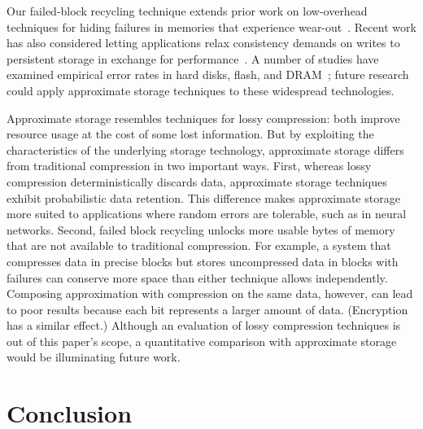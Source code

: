 \documentclass[prodmode,acmtocs]{acmsmall}
\begin{document}

Our failed-block recycling technique extends prior work on low-overhead
techniques for hiding failures in memories that experience
wear-out~\cite{ecp,safer,payg,zombie}.
Recent work has also considered letting applications relax
consistency demands on writes to persistent storage in exchange for performance~\cite{mempersistency,optfs}.
A number of studies have examined empirical error rates in hard disks, flash,
and DRAM~\cite{diskmttf,googledisk,flasherror,flasherrors};
future research could apply approximate storage techniques to
these widespread technologies.

Approximate storage resembles techniques for lossy compression: both improve
resource usage at the cost of some lost information. But by exploiting the
characteristics of the underlying storage technology, approximate storage
differs from traditional compression in two important ways. First, whereas
lossy compression deterministically discards data, approximate storage
techniques exhibit probabilistic data retention. This difference makes
approximate storage more suited to applications where random errors are
tolerable, such as in neural networks. Second, failed block recycling unlocks
more usable bytes of memory that are not available to traditional compression.
For example, a system that compresses data in precise blocks but stores
uncompressed data in blocks with failures can conserve more space than either
technique allows independently.
Composing approximation with compression on the same data, however, can lead
to poor results because each bit represents a larger amount of data.
(Encryption has a similar effect.)
Although an evaluation of lossy compression techniques is out of this paper's
scope, a quantitative comparison with approximate storage would be
illuminating future work.

\section{Conclusion}
\label{sec:conclusion}
\end{document}
